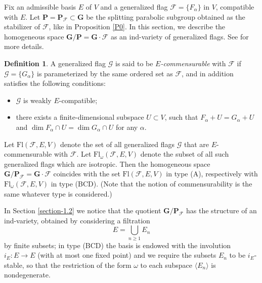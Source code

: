 \documentclass[12pt]{amsart}
\newcommand{\G}{\mathbf{G}}
\renewcommand{\P}{\mathbf{P}}
\newcommand{\Ff}{\mathcal{F}}
\newcommand{\Gg}{\mathcal{G}}
\renewcommand{\span}[1]{\langle #1\rangle}
\newcommand{\Fl}{\mathrm{Fl}}
\numberwithin{equation}{section}
\theoremstyle{definition}
\newtheorem{definition}[theorem]{Definition}
\begin{document}
Fix an admissible basis $E$ of $V$ and a generalized flag $\Ff=\{F_\alpha\}$ in $V$, compatible with $E$. 
Let $\P=\P_\Ff\subset \G$ be the splitting parabolic subgroup obtained as the stabilizer of $\Ff$, like in Proposition \ref{P0}. In this section, we describe the homogeneous space $\G/\P=\G\cdot\Ff$ as an ind-variety of generalized flags.
See \cite{Dimitrov-Penkov} for more details.

\begin{definition}
A generalized flag $\Gg$ is said to be {\em $E$-commensurable} with $\Ff$ if $\Gg=\{G_\alpha\}$ is parameterized by the same ordered set as $\Ff$, and in addition satisfies the following conditions:
\begin{itemize}
\item $\Gg$ is weakly $E$-compatible;
\item there exists a finite-dimensional subspace $U\subset V$, such that $F_\alpha+U=G_\alpha+U$ and $\dim F_\alpha\cap U=\dim G_\alpha\cap U$ for any $\alpha$.
\end{itemize}
\end{definition}

Let $\Fl(\Ff,E,V)$ denote the set of all generalized 
flags $\Gg$ that are $E$-commensurable with $\Ff$.
Let $\Fl_\omega(\Ff,E,V)$ denote the subset of all such generalized flags which are isotropic.
Then the homogeneous space $\G/\P_\Ff=\G\cdot\Ff$ coincides with the set $\Fl(\Ff,E,V)$ in type (A),
respectively with $\Fl_\omega(\Ff,E,V)$ in type (BCD). (Note that the notion of commensurability is the same whatever type is considered.)

In Section \ref{section-1.2} we notice that the quotient $\G/\P_\Ff$ has the structure of an ind-variety,
obtained by considering a filtration 
\[E=\bigcup_{n\geq 1} E_n\] 
by finite subsets; in type (BCD) the basis is endowed with the involution $i_E:E\to E$ (with at most one fixed point) and we require the subsets $E_n$ to be $i_E$-stable, so that the restriction of the form $\omega$ to each subspace $\span{E_n}$ is nondegenerate.
\end{document}
